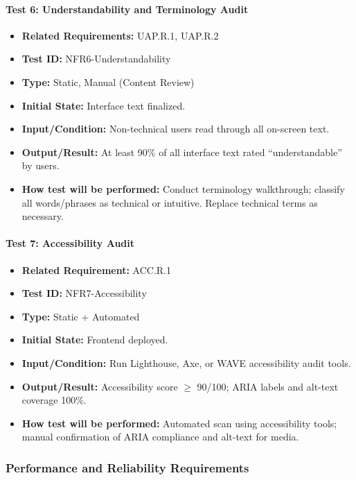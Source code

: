 \documentclass[12pt, titlepage]{article}
\begin{document}
\paragraph{Test 6: Understandability and Terminology Audit}
\begin{itemize}
    \item \textbf{Related Requirements:} UAP.R.1, UAP.R.2
    \item \textbf{Test ID:} NFR6-Understandability
    \item \textbf{Type:} Static, Manual (Content Review)
    \item \textbf{Initial State:} Interface text finalized.
    \item \textbf{Input/Condition:} Non-technical users read through all on-screen text.
    \item \textbf{Output/Result:} At least 90\% of all interface text rated “understandable” by users.
    \item \textbf{How test will be performed:} Conduct terminology walkthrough; classify all words/phrases as technical or intuitive. Replace technical terms as necessary.
\end{itemize}

\paragraph{Test 7: Accessibility Audit}
\begin{itemize}
    \item \textbf{Related Requirement:} ACC.R.1
    \item \textbf{Test ID:} NFR7-Accessibility
    \item \textbf{Type:} Static + Automated
    \item \textbf{Initial State:} Frontend deployed.
    \item \textbf{Input/Condition:} Run Lighthouse, Axe, or WAVE accessibility audit tools.
    \item \textbf{Output/Result:} Accessibility score $\geq$ 90/100; ARIA labels and alt-text coverage 100\%.
    \item \textbf{How test will be performed:} Automated scan using accessibility tools; manual confirmation of ARIA compliance and alt-text for media.
\end{itemize}

\subsubsection{Performance and Reliability Requirements}
\end{document}
